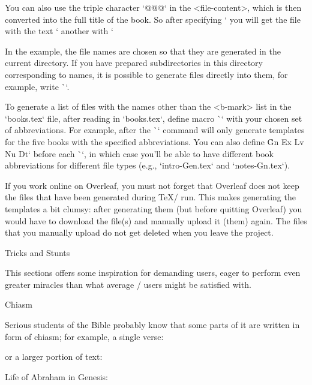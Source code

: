{{You can also use the triple character `@@@` in the <file-content>, which is then converted into
the full title of the book. So after specifying 
`%
you will get the file with the text `%
another with `%

In the example, the file names are chosen so that they are generated in the current
directory. If you have prepared subdirectories in this directory corresponding to
names, it is possible to generate files directly into them, for example, write
\``.

To generate a list of files with the names other than the <b-mark> list  in the `books.tex` file, 
after reading in `books.tex`, define macro \`\genbooks` with your chosen set of abbreviations. 
For example, after
\begtt
\def\genbooks {Gn Ex Lv Nu Dt}
\endtt
%
the \`\filegen` command will only generate templates for the five books with the specified
abbreviations. You can also define \`\genbooks` before each \`\filegen`, in which case
you'll be able to have different book abbreviations for different file types (e.g., `intro-Gen.tex` and `notes-Gn.tex`).

\watchout 
If you work online on Overleaf, you must not forget that Overleaf does not keep the files that have been generated during \TeX/ run. This makes generating the templates a bit clumsy: after generating them (but before quitting Overleaf) you would have to download the file(s) and manually upload it (them) again. The files that you manually upload do not get deleted when you leave the project.

\sec[tricks] Tricks and Stunts  

This sections offers some inspiration for demanding users, eager to perform even greater miracles
than what average \OpBible/ users might be satisfied with.

\secc Chiasm

Serious students of the Bible probably know that some parts of it are written in form of chiasm; for example, a single verse:
\medskip
{}
\medskip

\noindent or a larger portion of text:

\medskip
Life of Abraham in Genesis:

}}
